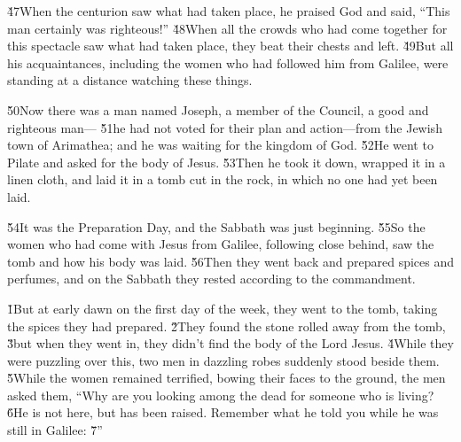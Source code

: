 \v{47}When the centurion saw what had taken place, he praised God and said, ``This man certainly was righteous!'' \v{48}When all the crowds who had come together for this spectacle saw what had taken place, they beat their chests and left. \v{49}But all his acquaintances, including the women who had followed him from Galilee, were standing at a distance watching these things.

\v{50}Now there was a man named Joseph, a member of the Council, a good and righteous man--- \v{51}he had not voted for their plan and action---from the Jewish town of Arimathea; and he was waiting for the kingdom of God. \v{52}He went to Pilate and asked for the body of Jesus. \v{53}Then he took it down, wrapped it in a linen cloth, and laid it in a tomb cut in the rock, in which no one had yet been laid.

\v{54}It was the Preparation Day, and the Sabbath was just beginning. \v{55}So the women who had come with Jesus from Galilee, following close behind, saw the tomb and how his body was laid. \v{56}Then they went back and prepared spices and perfumes, and on the Sabbath they rested according to the commandment.

\v{1}But at early dawn on the first day of the week, they went to the tomb, taking the spices they had prepared. \v{2}They found the stone rolled away from the tomb, \v{3}but when they went in, they didn't find the body of the Lord Jesus. \v{4}While they were puzzling over this, two men in dazzling robes suddenly stood beside them. \v{5}While the women remained terrified, bowing their faces to the ground, the men asked them, ``Why are you looking among the dead for someone who is living? \v{6}He is not here, but has been raised. Remember what he told you while he was still in Galilee: \v{7}''

